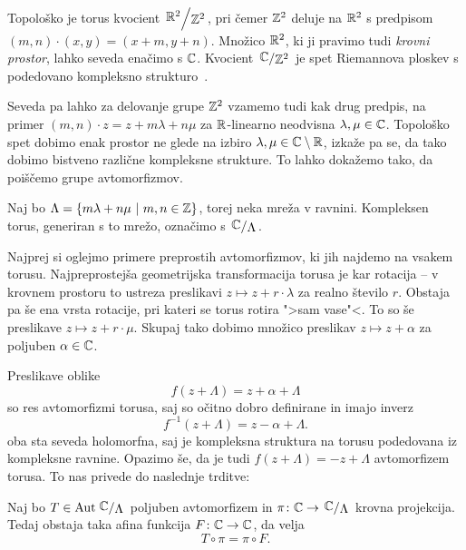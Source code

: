 Topološko je torus kvocient $\kvoc{\R^2}{\Z^2}$, pri čemer $\mathbb{Z}^2$
deluje na $\mathbb{R}^2$ s predpisom $(m,n) \cdot (x,y) = (x+m, y+n)$.
Množico $\mathbb{R}^2$, ki ji pravimo tudi \emph{krovni prostor}, lahko
seveda enačimo s $\mathbb{C}$. Kvocient $\kvoc{\C}{\Z^2}$ je spet
Riemannova ploskev s podedovano kompleksno
strukturo~\cite[razdelek~1.8.2]{Forstneric}.

Seveda pa lahko za delovanje grupe $\mathbb{Z}^2$ vzamemo tudi kak drug
predpis, na primer $(m,n) \cdot z = z + m \lambda+ n \mu$ za
$\mathbb{R}$-linearno neodvisna $\lambda, \mu \in \mathbb{C}$. Topološko spet
dobimo enak prostor ne glede na izbiro
$\lambda, \mu \in \mathbb{C} \setminus \mathbb{R}$, izkaže pa se, da tako dobimo
bistveno različne kompleksne strukture. To lahko dokažemo tako, da
poiščemo grupe avtomorfizmov.

Naj bo $\Lambda = \left\{m \lambda + n \mu~\middle\vert~m, n \in \mathbb{Z}\right\}$, torej
neka mreža v ravnini. Kompleksen torus, generiran s to mrežo,
označimo s $\kvoc{\C}{\Lambda}$.

Najprej si oglejmo primere preprostih avtomorfizmov, ki jih najdemo
na vsakem torusu. Najpreprostejša geometrijska transformacija
torusa je kar rotacija -- v krovnem prostoru to ustreza preslikavi
$z \mapsto z + r \cdot \lambda$ za realno število $r$. Obstaja pa
še ena vrsta rotacije, pri kateri se torus rotira ">sam vase"<.
To so še preslikave $z \mapsto z + r \cdot \mu$. Skupaj tako dobimo
množico preslikav $z \mapsto z + \alpha$ za poljuben
$\alpha \in \mathbb{C}$.



Preslikave oblike
\[
f(z + \Lambda) = z + \alpha + \Lambda
\]
so res avtomorfizmi torusa, saj so očitno dobro definirane in imajo
inverz
\[
f^{-1}(z + \Lambda) = z-\alpha + \Lambda.
\]
oba sta seveda holomorfna, saj je kompleksna struktura na torusu
podedovana iz kompleksne ravnine. Opazimo še, da je tudi
$f(z + \Lambda) = -z + \Lambda$ avtomorfizem torusa. To nas privede
do naslednje trditve:

\begin{trditev}
Naj bo $T \in \Aut \kvoc{\C}{\Lambda}$ poljuben avtomorfizem in
$\pi \colon \C \to \kvoc{\C}{\Lambda}$ krovna projekcija. Tedaj
obstaja taka afina funkcija $F \colon \mathbb{C} \to \mathbb{C}$, da velja
\[
T \circ \pi = \pi \circ F.
\]
\end{trditev}

